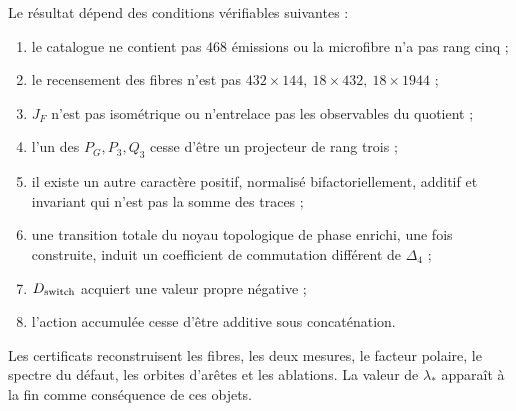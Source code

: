 Le résultat dépend des conditions vérifiables suivantes :
\begin{enumerate}
  \item le catalogue ne contient pas \(468\) émissions ou la microfibre n’a pas
  rang cinq ;
  \item le recensement des fibres n’est pas
  \(432\times144,\ 18\times432,\ 18\times1944\) ;
  \item \(J_F\) n’est pas isométrique ou n’entrelace pas les observables du quotient ;
  \item l’un des \(P_G,P_3,Q_3\) cesse d’être un projecteur de rang trois ;
  \item il existe un autre caractère positif, normalisé bifactoriellement, additif et
  invariant qui n’est pas la somme des traces ;
  \item une transition totale du noyau topologique de phase enrichi, une fois construite, induit un
  coefficient de commutation différent de \(\Delta_4\) ;
  \item \(D_{\rm switch}\) acquiert une valeur propre négative ;
  \item l’action accumulée cesse d’être additive sous concaténation.
\end{enumerate}

Les certificats reconstruisent les fibres, les deux mesures, le facteur polaire,
le spectre du défaut, les orbites d’arêtes et les ablations. La valeur de
\(\lambda_*\) apparaît à la fin comme conséquence de ces objets.
\fi
